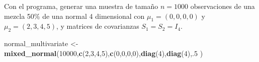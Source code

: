 \documentclass[]{article}
\newenvironment{Shaded}{\begin{snugshade}}{\end{snugshade}}
\newcommand{\ControlFlowTok}[1]{\textcolor[rgb]{0.13,0.29,0.53}{\textbf{#1}}}
\newcommand{\DataTypeTok}[1]{\textcolor[rgb]{0.13,0.29,0.53}{#1}}
\newcommand{\DecValTok}[1]{\textcolor[rgb]{0.00,0.00,0.81}{#1}}
\newcommand{\KeywordTok}[1]{\textcolor[rgb]{0.13,0.29,0.53}{\textbf{#1}}}
\newcommand{\NormalTok}[1]{#1}
\newcommand{\OperatorTok}[1]{\textcolor[rgb]{0.81,0.36,0.00}{\textbf{#1}}}
\newcommand{\StringTok}[1]{\textcolor[rgb]{0.31,0.60,0.02}{#1}}
\begin{document}
\begin{Shaded}
\end{Shaded}

Con el programa, generar una muestra de tamaño \(n = 1000\)
observaciones de una mezcla 50\% de una normal 4 dimensional con
\(\mu_1 =(0,0,0,0)\) y \(\mu_2 = (2, 3, 4, 5)\), y matrices de
covarianzas \(S_1 = S_2 = I_4\).

\begin{Shaded}
\begin{Highlighting}[]
\NormalTok{normal_multivariate <-}\StringTok{ }\KeywordTok{mixed_normal}\NormalTok{(}\DecValTok{10000}\NormalTok{,}\KeywordTok{c}\NormalTok{(}\DecValTok{2}\NormalTok{,}\DecValTok{3}\NormalTok{,}\DecValTok{4}\NormalTok{,}\DecValTok{5}\NormalTok{),}\KeywordTok{c}\NormalTok{(}\DecValTok{0}\NormalTok{,}\DecValTok{0}\NormalTok{,}\DecValTok{0}\NormalTok{,}\DecValTok{0}\NormalTok{),}\KeywordTok{diag}\NormalTok{(}\DecValTok{4}\NormalTok{),}\KeywordTok{diag}\NormalTok{(}\DecValTok{4}\NormalTok{),.}\DecValTok{5}\NormalTok{ )}
\end{Highlighting}
\end{Shaded}
\end{document}

